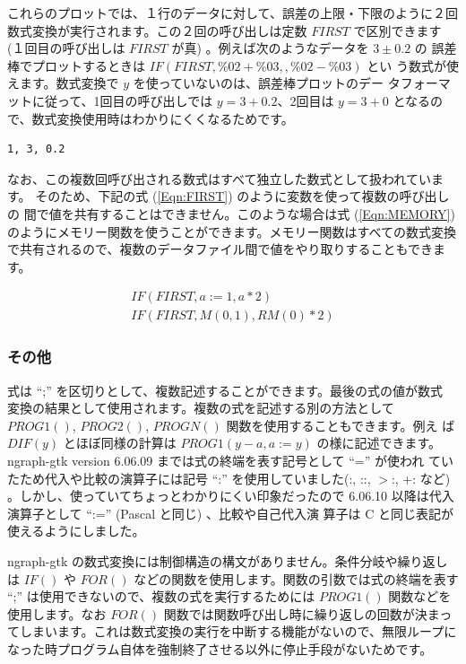 \documentclass[mingoth,a4paper,twoside]{jsarticle}
\begin{document}
これらのプロットでは、１行のデータに対して、誤差の上限・下限のように２回
数式変換が実行されます。この２回の呼び出しは定数 $FIRST$ で区別できます
(１回目の呼び出しは $FIRST$ が真) 。例えば次のようなデータを $3\pm0.2$ の
誤差棒でプロットするときは $IF(FIRST, \%02 + \%03, , \%02 - \%03)$ とい
う数式が使えます。数式変換で $y$ を使っていないのは、誤差棒プロットのデー
タフォーマットに従って、1回目の呼び出しでは $y=3+0.2$、2回目は $y=3+0$
となるので、数式変換使用時はわかりにくくなるためです。

\begin{verbatim}
1, 3, 0.2
\end{verbatim}

なお、この複数回呼び出される数式はすべて独立した数式として扱われています。
そのため、下記の式 (\ref{Eqn:FIRST}) のように変数を使って複数の呼び出しの
間で値を共有することはできません。このような場合は式 (\ref{Eqn:MEMORY})
のようにメモリー関数を使うことができます。メモリー関数はすべての数式変換
で共有されるので、複数のデータファイル間で値をやり取りすることもできます。

\begin{eqnarray}
 IF(FIRST, a := 1, a * 2) \label{Eqn:FIRST}\\
 IF(FIRST, M(0, 1), RM(0) * 2) \label{Eqn:MEMORY}
\end{eqnarray}

\subsubsection{その他}

式は ``;'' を区切りとして、複数記述することができます。最後の式の値が数式
変換の結果として使用されます。複数の式を記述する別の方法として
$PROG1()$, $PROG2()$, $PROGN()$ 関数を使用することもできます。例え
ば $DIF(y)$ とほぼ同様の計算は $PROG1(y-a, a:=y)$ の様に記述できます。
ngraph-gtk version 6.06.09 までは式の終端を表す記号として ``='' が使われ
ていたため代入や比較の演算子には記号 ``:'' を使用していました(:, ::,
$>$:, +: など) 。しかし、使っていてちょっとわかりにくい印象だったので
6.06.10 以降は代入演算子として ``:='' (Pascal と同じ) 、比較や自己代入演
算子は C と同じ表記が使えるようにしました。

ngraph-gtk の数式変換には制御構造の構文がありません。条件分岐や繰り返しは
$IF()$ や $FOR()$ などの関数を使用します。関数の引数では式の終端を表す
``;'' は使用できないので、複数の式を実行するためには $PROG1()$ 関数などを
使用します。なお $FOR()$ 関数では関数呼び出し時に繰り返しの回数が決まっ
てしまいます。これは数式変換の実行を中断する機能がないので、無限ループに
なった時プログラム自体を強制終了させる以外に停止手段がないためです。
\end{document}
